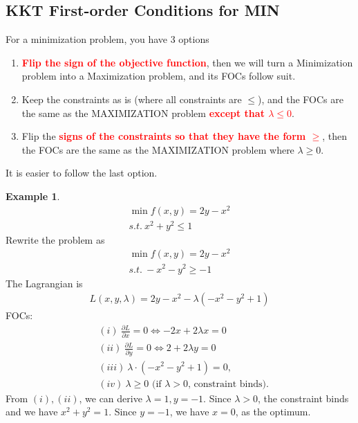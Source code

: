 \documentclass[11pt,a4paper]{book}
\newcommand{\red}[1]{\textcolor{red}{#1}}
\theoremstyle{definition}\newtheorem{definition}{Definition}
\theoremstyle{definition}\newtheorem{fact}{Fact}
\theoremstyle{definition}\newtheorem{remark}{Remark}
\theoremstyle{definition}\newtheorem{ex}{Ex.}
\theoremstyle{definition}\newtheorem{project}{Project}
\theoremstyle{definition}\newtheorem{problem}{Problem}
\theoremstyle{definition}\newtheorem{example}{Example}
\numberwithin{theorem}{section}
\numberwithin{corollary}{chapter}
\numberwithin{assumption}{chapter}
\numberwithin{definition}{chapter}
\numberwithin{prop}{chapter}
\numberwithin{notation}{chapter}
\numberwithin{problem}{chapter}
\numberwithin{example}{chapter}
\numberwithin{fact}{chapter}
\numberwithin{ex}{chapter}
\begin{document}
	\subsection{KKT First-order Conditions for MIN}
	For a minimization problem, you have 3 options
	\begin{enumerate}
		\item \textbf{\red{Flip the sign of the objective function}}, then we will turn a Minimization problem into a Maximization problem, and its FOCs follow suit.
		\item Keep the constraints as is (where all constraints are $\leq$), and the FOCs are the same as the MAXIMIZATION problem \textbf{\red{except that $\lambda \leq 0$}}.
		\item Flip the \textbf{\red{signs of the constraints so that they have the form $\geq$}}, then the FOCs are the same as the MAXIMIZATION problem where $\lambda \geq 0$.
	\end{enumerate}
	
	It is easier to follow the last option.
	\begin{example} \label{example:kkt1}
		\begin{align*}
			\min f(x,y) = 2y - x^2  \\
			s.t. \  x^2 + y^2 \leq 1
		\end{align*}
		Rewrite the problem as
		\begin{align*}
			\min f(x,y) = 2y - x^2  \\
			s.t. \  - x^2 - y^2 \geq -1
		\end{align*}
		The Lagrangian is
		\begin{align*}
			L(x,y,\lambda) = 2y - x^2 - \lambda (-x^2 - y^2 + 1)
		\end{align*}
		FOCs:
		\begin{align*}
			&(i) \ \frac{\partial L}{\partial x} = 0 \iff -2x + 2\lambda x = 0 \\
			&(ii) \ \frac{\partial L}{\partial y} = 0 \iff 2 + 2\lambda y = 0 \\
			&(iii) \ \lambda \cdot (- x^2 - y^2  +1) = 0, \\
			&(iv) \ \lambda \geq 0  \text{ (if $\lambda > 0$, constraint binds).}
		\end{align*}
		From $(i), (ii)$, we can derive $\lambda = 1, y = -1$. Since $\lambda > 0$, the constraint binds and we have $x^2 + y^2 = 1$. Since $y=-1$, we have $x=0$, as the optimum.
	\end{example}
	
\end{document}
